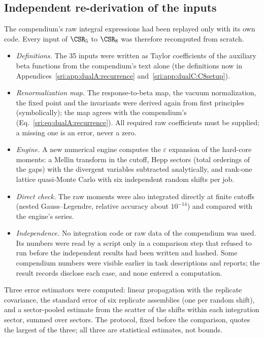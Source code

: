 \subsection{Independent re-derivation of the inputs}\label{sri:sec:indep}
The compendium's raw integral expressions had been replayed only with its own code. Every input of $\CSR_5$ to
$\CSR_8$ was therefore recomputed from scratch.
\begin{itemize}
\item \emph{Definitions.} The 35 inputs were written as Taylor coefficients of the auxiliary beta functions from the
 compendium's text alone (the definitions now in Appendices~\ref{sri:app:dualA:recurrence} and~\ref{sri:app:dualC:C8setup}).
\item \emph{Renormalization map.} The response-to-beta map, the vacuum normalization, the fixed point and the
 invariants were derived again from first principles (symbolically); the map agrees with the compendium's (Eq.~\eqref{sri:eq:dualA:recurrence}). All
 required raw coefficients must be supplied; a missing one is an error, never a zero.
\item \emph{Engine.} A new numerical engine computes the $\varepsilon$ expansion of the hard-core moments: a Mellin
 transform in the cutoff, Hepp sectors (total orderings of the gaps) with the divergent variables subtracted
 analytically, and rank-one lattice quasi-Monte Carlo with six independent random shifts per job.
\item \emph{Direct check.} The raw moments were also integrated directly at finite cutoffs (nested Gauss--Legendre,
 relative accuracy about $10^{-14}$) and compared with the engine's series.
\item \emph{Independence.} No integration code or raw data of the compendium was used. Its numbers were read by a
 script only in a comparison step that refused to run before the independent results had been written and hashed.
 Some compendium numbers were visible earlier in task descriptions and reports; the result records disclose each
 case, and none entered a computation.
\end{itemize}
Three error estimators were computed: linear propagation with the replicate covariance, the standard error of six
replicate assemblies (one per random shift), and a sector-pooled estimate from the scatter of the shifts within each
integration sector, summed over sectors. The protocol, fixed before the comparison, quotes the largest of the three;
all three are statistical estimates, not bounds.

